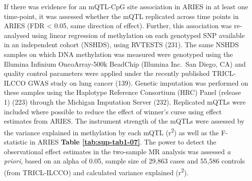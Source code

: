 \documentclass[11pt,oneside]{bristolthesis}
\begin{document}
If there was evidence for an mQTL-CpG site association in ARIES in at least one time-point, it was assessed whether the mQTL replicated across time points in ARIES (FDR \textless{} 0.05, same direction of effect). Further, this association was re-analysed using linear regression of methylation on each genotyped SNP available in an independent cohort (NSHDS), using RVTESTS (231). The same NSHDS samples on which DNA methylation was measured were genotyped using the Illumina Infinium OncoArray-500k BeadChip (Illumina Inc.~San Diego, CA) and quality control parameters were applied under the recently published TRICL-ILCCO GWAS study on lung cancer (139). Genetic imputation was performed on these samples using the Haplotype Reference Consortium (HRC) Panel (release 1) (223) through the Michigan Imputation Server (232). Replicated mQTLs were included where possible to reduce the effect of winner's curse using effect estimates from ARIES. The instrument strength of the mQTLs were assessed by the variance explained in methylation by each mQTL (r\textsuperscript{2}) as well as the F-statistic in ARIES \textbf{Table \ref{tab:sup-tab1-07}}. The power to detect the observational effect estimates in the two-sample MR analysis was assessed \emph{a priori}, based on an alpha of 0.05, sample size of 29,863 cases and 55,586 controls (from TRICL-ILCCO) and calculated variance explained (r\textsuperscript{2}). \linebreak
\end{document}
